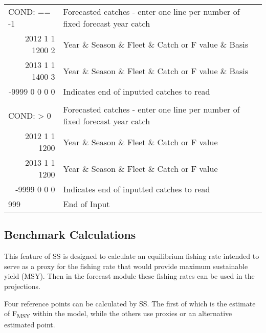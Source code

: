 \begin{landscape}
{\begin{longtable}{p{3.2cm} p{7cm} p{10.8cm}}
  \hline
  \multicolumn{1}{l}{COND: == -1 }& \multicolumn{2}{l}{Forecasted catches - enter one line per number of fixed forecast year catch} \Tstrut\\
  \multicolumn{1}{r}{2012 1 1 1200 2}  & \multicolumn{2}{l}{Year \& Season \& Fleet \& Catch or F value \& Basis}  \\
  \multicolumn{1}{r}{2013 1 1 1400 3}  & \multicolumn{2}{l}{Year \& Season \& Fleet \& Catch or F value \& Basis}  \\
  \multicolumn{1}{r}{-9999 0 0 0 0}  & \multicolumn{2}{l}{Indicates end of inputted catches to read}  \Bstrut\\
  \\
  \multicolumn{1}{l}{COND: > 0 }& \multicolumn{2}{l}{Forecasted catches - enter one line per number of fixed forecast year catch }\Tstrut\\
  \multicolumn{1}{r}{2012  1 1 1200}  & \multicolumn{2}{l}{Year \& Season \& Fleet \& Catch or F value}  \\
  \multicolumn{1}{r}{2013  1 1 1200}  & \multicolumn{2}{l}{Year \& Season \& Fleet \& Catch or F value}  \\
  \multicolumn{1}{r}{-9999 0 0 0}  & \multicolumn{2}{l}{Indicates end of inputted catches to read}  \Bstrut\\
  
  \hline
  999 & End of Input & \Bstrut\\

  \end{longtable}}  
\end{landscape}

\hypertarget{Benchmark}{}
\subsection{Benchmark Calculations}
This feature of SS is designed to calculate an equilibrium fishing rate intended to serve as a proxy for the fishing rate that would provide maximum sustainable yield (MSY).  Then in the forecast module these fishing rates can be used in the projections.

Four reference points can be calculated by SS.  The first of which is the estimate of F\textsubscript{MSY} within the model, while the others use proxies or an alternative estimated point.

